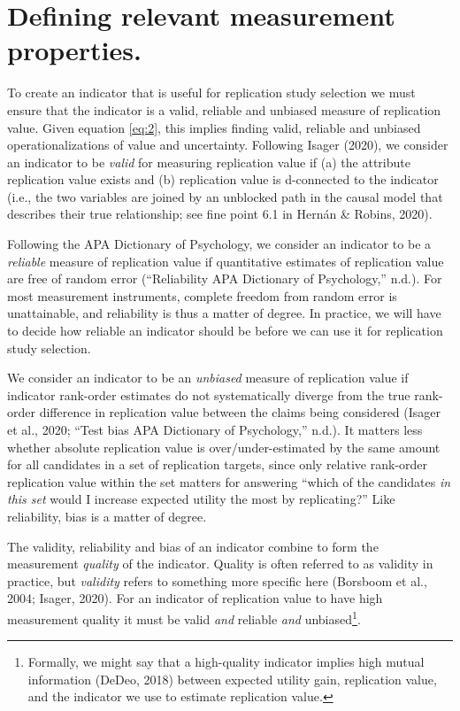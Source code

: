 \documentclass[
  english,
  jou,floatsintext]{apa6}
\begin{document}
\hypertarget{defining-relevant-measurement-properties.}{%
\section{Defining relevant measurement properties.}\label{defining-relevant-measurement-properties.}}

To create an indicator that is useful for replication study selection we must ensure that the indicator is a valid, reliable and unbiased measure of replication value. Given equation \eqref{eq:2}, this implies finding valid, reliable and unbiased operationalizations of value and uncertainty. Following Isager (2020), we consider an indicator to be \emph{valid} for measuring replication value if (a) the attribute replication value exists and (b) replication value is d-connected to the indicator (i.e., the two variables are joined by an unblocked path in the causal model that describes their true relationship; see fine point 6.1 in Hernán \& Robins, 2020).

Following the APA Dictionary of Psychology, we consider an indicator to be a \emph{reliable} measure of replication value if quantitative estimates of replication value are free of random error ({``Reliability \textendash{} {APA Dictionary} of {Psychology},''} n.d.). For most measurement instruments, complete freedom from random error is unattainable, and reliability is thus a matter of degree. In practice, we will have to decide how reliable an indicator should be before we can use it for replication study selection.

We consider an indicator to be an \emph{unbiased} measure of replication value if indicator rank-order estimates do not systematically diverge from the true rank-order difference in replication value between the claims being considered (Isager et al., 2020; {``Test bias \textendash{} {APA Dictionary} of {Psychology},''} n.d.). It matters less whether absolute replication value is over/under-estimated by the same amount for all candidates in a set of replication targets, since only relative rank-order replication value within the set matters for answering ``which of the candidates \emph{in this set} would I increase expected utility the most by replicating?'' Like reliability, bias is a matter of degree.

The validity, reliability and bias of an indicator combine to form the measurement \emph{quality} of the indicator. Quality is often referred to as validity in practice, but \emph{validity} refers to something more specific here (Borsboom et al., 2004; Isager, 2020). For an indicator of replication value to have high measurement quality it must be valid \emph{and} reliable \emph{and} unbiased\footnote{Formally, we might say that a high-quality indicator implies high mutual information (DeDeo, 2018) between expected utility gain, replication value, and the indicator we use to estimate replication value.}.
\end{document}

